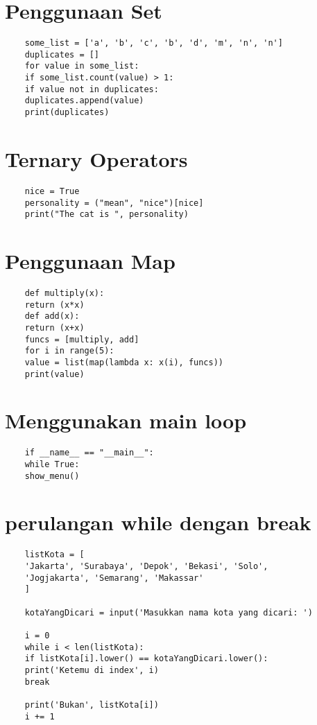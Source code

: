 \documentclass[12pt]{article} %
\begin{document}
\section {Penggunaan Set }
\begin{lstlisting}
	some_list = ['a', 'b', 'c', 'b', 'd', 'm', 'n', 'n']
	duplicates = []
	for value in some_list:
	if some_list.count(value) > 1:
	if value not in duplicates:
	duplicates.append(value)
	print(duplicates)
\end{lstlisting}

\section {Ternary Operators }
\begin{lstlisting}
	nice = True
	personality = ("mean", "nice")[nice]
	print("The cat is ", personality)
	\end{lstlisting}
	
	\section {Penggunaan Map}
	\begin{lstlisting}
	def multiply(x):
	return (x*x)
	def add(x):
	return (x+x)
	funcs = [multiply, add]
	for i in range(5):
	value = list(map(lambda x: x(i), funcs))
	print(value)
	\end{lstlisting}
	
	\section{Menggunakan main loop}
	\begin{lstlisting}
	if __name__ == "__main__":
	while True:
	show_menu()
\end{lstlisting}

\section {perulangan while dengan break}
\begin{lstlisting}
	listKota = [
	'Jakarta', 'Surabaya', 'Depok', 'Bekasi', 'Solo',
	'Jogjakarta', 'Semarang', 'Makassar'
	]
	
	kotaYangDicari = input('Masukkan nama kota yang dicari: ')
	
	i = 0
	while i < len(listKota):
	if listKota[i].lower() == kotaYangDicari.lower():
	print('Ketemu di index', i)
	break
	
	print('Bukan', listKota[i])
	i += 1

\end{lstlisting}
\end{document}
